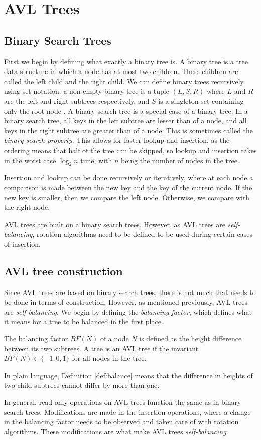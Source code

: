 \section{AVL Trees}

\subsection{Binary Search Trees}
First we begin by defining what exactly a binary tree is. A binary tree is a tree data structure in which a node has at most two children. These children are called
the left child and the right child. We can define binary trees recursively using set notation: a non-empty binary tree is a tuple $(L, S, R)$ where $L$ and $R$ are the left and right
subtrees respectively, and $S$ is a singleton set containing only the root node \cite{tree:set_not}. A binary search tree is a special case of a binary tree. In a binary search tree, all keys 
in the left subtree are lesser than of a node, and all keys in the right subtree are greater than of a node. This is sometimes called the \textit{binary search property}. This allows for faster lookup and insertion, as the ordering means that
half of the tree can be skipped, so lookup and insertion takes in the worst case $\log_2 n$ time, with $n$ being the number of nodes in the tree.

Insertion and lookup can be done recursively or iteratively, where at each node a comparison is made between the new key and the key of the current node. If the new key is smaller, then we compare the left node. Otherwise, we compare with the right node.

AVL trees are built on a binary search trees. However, as AVL trees are \textit{self-balancing}, rotation algorithms need to be defined to be used during certain cases of insertion.

\subsection{AVL tree construction}
Since AVL trees are based on binary search trees, there is not much that needs to be done in terms of construction. However, as mentioned previously, AVL trees are \textit{self-balancing}. 
We begin by defining the \textit{balancing factor}, which defines what it means for a tree to be balanced in the first place.

\begin{definition} 
  The balancing factor $BF(N)$ of a node $N$ is defined as the height difference between its two subtrees. A tree is an AVL tree if the invariant
  $BF(N) \in \{-1, 0, 1\} $ for all nodes in the tree.
  \label{def:balance}
\end{definition}

In plain language, Definition \ref{def:balance} means that the difference in heights of two child subtrees cannot differ by more than one. 

In general, read-only operations on AVL trees function the same as in binary search trees. Modifications are made in the insertion operations, where 
a change in the balancing factor needs to be observed and taken care of with rotation algorithms. These modifications are what make AVL trees \textit{self-balancing}.